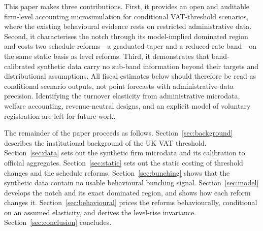 This paper makes three contributions. First, it provides an open and auditable
firm-level accounting microsimulation for conditional VAT-threshold scenarios,
where the existing behavioural evidence rests on restricted administrative
data. Second, it characterises the notch through its model-implied dominated
region and costs two schedule reforms---a graduated taper and a reduced-rate
band---on the same static basis as level reforms. Third, it demonstrates that
band-calibrated synthetic data carry no sub-band information beyond their
targets and distributional assumptions. All fiscal estimates below should
therefore be read as conditional scenario outputs, not point forecasts with
administrative-data precision. Identifying the turnover elasticity from
administrative microdata, welfare accounting, revenue-neutral designs, and an
explicit model of voluntary registration are left for future work.

The remainder of the paper proceeds as follows. Section~\ref{sec:background} describes the institutional background of the UK VAT threshold. Section~\ref{sec:data} sets out the synthetic firm microdata and its calibration to official aggregates. Section~\ref{sec:static} sets out the static costing of threshold changes and the schedule reforms. Section~\ref{sec:bunching} shows that the synthetic data contain no usable behavioural bunching signal. Section~\ref{sec:model} develops the notch and its exact dominated region, and shows how each reform changes it. Section~\ref{sec:behavioural} prices the reforms behaviourally, conditional on an assumed elasticity, and derives the level-rise invariance. Section~\ref{sec:conclusion} concludes.
